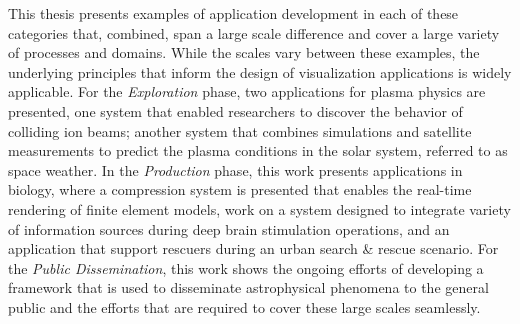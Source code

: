 This thesis presents examples of application development in each of these categories that, combined, span a large scale difference and cover a large variety of processes and domains.  While the scales vary between these examples, the underlying principles that inform the design of visualization applications is widely applicable.  For the \emph{Exploration} phase, two applications for plasma physics are presented, one system that enabled researchers to discover the behavior of colliding ion beams; another system that combines simulations and satellite measurements to predict the plasma conditions in the solar system, referred to as space weather.  In the \emph{Production} phase, this work presents applications in biology, where a compression system is presented that enables the real-time rendering of finite element models, work on a system designed to integrate variety of information sources during deep brain stimulation operations, and an application that support rescuers during an urban search \& rescue scenario.  For the \emph{Public Dissemination}, this work shows the ongoing efforts of developing a framework that is used to disseminate astrophysical phenomena to the general public and the efforts that are required to cover these large scales seamlessly.